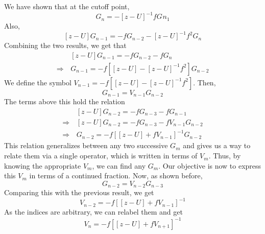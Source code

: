 \documentclass[a4paper, 11pt]{report}
\begin{document}
We have shown that at the cutoff point,
\begin{displaymath}
G^{}_n = -\left[z - U\right]^{-1} f G^{}n_1
\end{displaymath}
Also,
\begin{displaymath}
\left[z - U\right] G^{}_{n-1} = - f G^{}_{n-2} - \left[z - U\right]^{-1} f^2 G^{}_{n}
\end{displaymath}
Combining the two results, we get that
\begin{displaymath}
\begin{split}
&\left[z - U\right] G^{}_{n-1} = - f G^{}_{n-2} - f G^{}_{n}\\
\Rightarrow\,&G^{}_{n-1} = -f\left[ \left[ z - U \right] - \left[ z - U \right]^{-1}f^2 \right] G^{}_{n-2}
\end{split}
\end{displaymath}
We define the symbol $V^{}_{n-1} = -f\left[ \left[ z - U \right] - \left[ z - U \right]^{-1}f^2 \right]$. Then,
\begin{displaymath}
G^{}_{n-1} = V^{}_{n-1} G^{}_{n-2}
\end{displaymath}
The terms above this hold the relation
\begin{displaymath}
\begin{split}
&\left[z - U\right] G^{}_{n-2} = - f G^{}_{n-3} - f G^{}_{n-1}\\
\Rightarrow\, & \left[z - U\right] G^{}_{n-2} = - f G^{}_{n-3} - f V^{}_{n-1} G^{}_{n-2}\\
\Rightarrow\, & G^{}_{n-2} = -f \left[ \left[ z - U \right] + f V^{}_{n-1} \right]^{-1} G^{}_{n-2}
\end{split}
\end{displaymath}
This relation generalizes between any two successive $G^{}_{m}$ and gives us a way to relate them via a single operator, which is written in terms of $V^{}_{m}$. Thus, by knowing the appropriate $V^{}_{m}$, we can find any $G^{}_{m}$. Our objective is now to express this $V^{}_{m}$ in terms of a continued fraction. Now, as shown before,
\begin{displaymath}
G^{}_{n-2} = V^{}_{n-2} G^{}_{n-3}
\end{displaymath}
Comparing this with the previous result, we get
\begin{displaymath}
V^{}_{n-2} = -f \left[ \left[ z - U \right] + f V^{}_{n-1} \right]^{-1}
\end{displaymath}
As the indices are arbitrary, we can relabel them and get
\begin{equation}\label{eqn:V_relation}
V^{}_{n} = -f \left[ \left[ z - U \right] + f V^{}_{n+1} \right]^{-1}
\end{equation}
\end{document}
